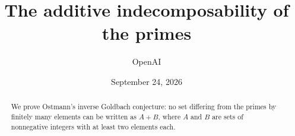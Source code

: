 \documentclass[11pt]{article}
\title{The additive indecomposability of the primes}
\author{OpenAI}
\date{September 24, 2026}
\numberwithin{equation}{section}
\theoremstyle{definition}
\begin{document}
\maketitle
\begin{abstract}
We prove Ostmann's inverse Goldbach conjecture: no set differing from the primes
by finitely many elements can be written as $A+B$, where $A$ and $B$ are sets
of nonnegative integers with at least two elements each.
\end{abstract}
\begingroup
\small
\tableofcontents
\endgroup









\begingroup
\small
\raggedright
{}
{}


\endgroup
\end{document}
